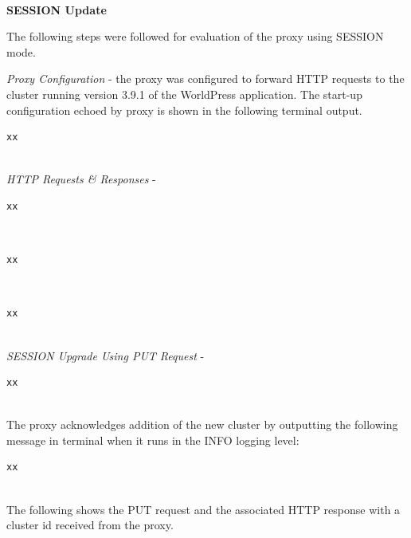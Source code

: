 \documentclass[a4paper,11pt,twoside]{article}
\begin{document}
\noindent\\
\textbf{SESSION Update}

\noindent
The following steps were followed for evaluation of the proxy using SESSION mode.\medskip

\noindent
\textit{Proxy Configuration} - the proxy was configured to forward HTTP requests to the cluster running version 3.9.1 of the WorldPress application. The start-up configuration echoed by proxy is shown in the following terminal output.\smallskip

\begin{lstlisting}[language=terminal]
xx
\end{lstlisting}

\noindent \\
\textit{HTTP Requests \& Responses} - 



\begin{lstlisting}[language=terminal]
xx
\end{lstlisting} 

\noindent\\


\smallskip

\begin{lstlisting}[language=terminal] 
xx
\end{lstlisting} 

\noindent\\

 \smallskip 

\begin{lstlisting}[language=terminal] 
xx
\end{lstlisting} 

\noindent\\
\textit{SESSION Upgrade Using PUT Request} - 

 \smallskip 

\begin{lstlisting}[language=terminal] 
xx
\end{lstlisting}

\noindent\\
The proxy acknowledges addition of the new cluster by outputting the following message in terminal when it runs in the INFO logging level: \smallskip 

\begin{lstlisting}[language=terminal] 
xx
\end{lstlisting}   

\noindent\\
The following shows the PUT request and the associated HTTP response with a cluster id received from the proxy.\smallskip 
\end{document}

